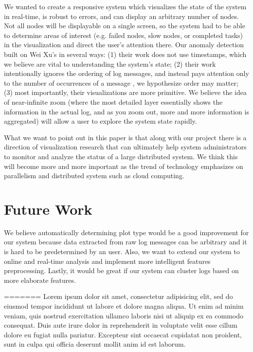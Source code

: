 \documentclass[conference]{style/acmsiggraph}
\begin{document}
We wanted to create a responsive system which visualizes the state of the system in real-time, is
robust to errors, and can display an arbitrary number of nodes. Not all nodes will be displayable on
a single screen, so the system had to be able to determine areas of interest (e.g. failed nodes,
slow nodes, or completed tasks) in the visualization and direct the user’s attention there. Our
anomaly detection built on Wei Xu's in several ways: (1) their work does not use timestamps, which
we believe are vital to understanding the system’s state; (2) their work intentionally ignores the
ordering of log messages, and instead pays attention only to the number of occurrences of a message
, we hypothesize order may matter; (3) most importantly, their visualizations are more primitive. We
believe the idea of near-infinite zoom (where the most detailed layer essentially shows the
information in the actual log, and as you zoom out, more and more information is aggregated) will
allow a user to explore the system state rapidly.

What we want to point out in this paper is that along with our project there is a direction of
visualization research that can ultimately help system administrators to monitor and analyze the
status of a large distributed system. We think this will become more and more important as the trend
of technology emphasizes on parallelism and distributed system such as cloud computing.


\section{Future Work}

We believe automatically determining plot type would be a good improvement for our system because
data extracted from raw log messages can be arbitrary and it is hard to be predetermined by an user.
Also, we want to extend our system to online and real-time analysis and implement more intelligent
features preprocessing. Lastly, it would be great if our system can cluster logs based on more
elaborate features.

=======
Lorem ipsum dolor sit amet, consectetur adipisicing elit, sed do
eiusmod tempor incididunt ut labore et dolore magna aliqua. Ut enim ad
minim veniam, quis nostrud exercitation ullamco laboris nisi ut
aliquip ex ea commodo consequat. Duis aute irure dolor in
reprehenderit in voluptate velit esse cillum dolore eu fugiat nulla
pariatur. Excepteur sint occaecat cupidatat non proident, sunt in
culpa qui officia deserunt mollit anim id est laborum.
\end{document}
